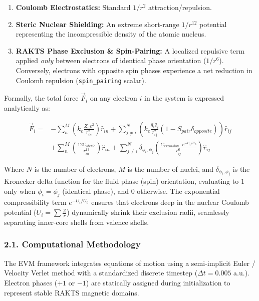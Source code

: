 \documentclass[
]{article}
\providecommand{\tightlist}{%
  \setlength{\itemsep}{0pt}\setlength{\parskip}{0pt}}
\begin{document}
\begin{enumerate}
\def\labelenumi{\arabic{enumi}.}
\tightlist
\item
  \textbf{Coulomb Electrostatics:} Standard \(1/r^2\)
  attraction/repulsion.
\item
  \textbf{Steric Nuclear Shielding:} An extreme short-range \(1/r^{12}\)
  potential representing the incompressible density of the atomic
  nucleus.
\item
  \textbf{RAKTS Phase Exclusion \& Spin-Pairing:} A localized repulsive
  term applied \emph{only} between electrons of identical phase
  orientation (\(1/r^6\)). Conversely, electrons with opposite spin
  phases experience a net reduction in Coulomb repulsion
  (\texttt{spin\_pairing} scalar).
\end{enumerate}

Formally, the total force \(\vec{F}_i\) on any electron \(i\) in the
system is expressed analytically as:

\[
\begin{aligned}
\vec{F}_i = &-\sum_{n}^{M} \left( k_e \frac{Z_n e^2}{r_{in}^2} \right) \hat{r}_{in} 
+ \sum_{j \neq i}^{N} \left( k_e \frac{q_i q_j}{r_{ij}^2} (1 - S_{pair} \delta_{opposite}) \right) \hat{r}_{ij} \\
&+ \sum_{n}^{M} \left( \frac{12 C_{steric}}{r_{in}^{13}} \right) \hat{r}_{in} 
+ \sum_{j \neq i}^{N} \delta_{\phi_i, \phi_j} \left( \frac{C_{exclusion} \cdot e^{-U_i/U_0}}{r_{ij}^6} \right) \hat{r}_{ij}
\end{aligned}
\]

Where \(N\) is the number of electrons, \(M\) is the number of nuclei,
and \(\delta_{\phi_i, \phi_j}\) is the Kronecker delta function for the
fluid phase (spin) orientation, evaluating to \(1\) only when
\(\phi_i = \phi_j\) (identical phase), and \(0\) otherwise. The
exponential compressibility term \(e^{-U_i/U_0}\) ensures that electrons
deep in the nuclear Coulomb potential (\(U_i = \sum \frac{Z}{r}\))
dynamically shrink their exclusion radii, seamlessly separating
inner-core shells from valence shells.

\subsubsection{2.1. Computational
Methodology}\label{computational-methodology}

The EVM framework integrates equations of motion using a semi-implicit
Euler / Velocity Verlet method with a standardized discrete timestep
(\(\Delta t = 0.005\) a.u.). Electron phases (\(+1\) or \(-1\)) are
statically assigned during initialization to represent stable RAKTS
magnetic domains.
\end{document}
